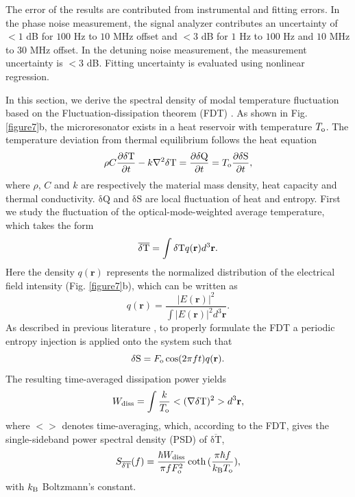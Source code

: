 \documentclass[noshowpacs,amsmath,
twocolumn,
superscriptaddress,
8pt,
aps,prb]{revtex4-2}
\begin{document}
\begin{footnotesize}
The error of the results are contributed from instrumental and fitting errors. In the phase noise measurement, the signal analyzer contributes an uncertainty of $<1$ dB for $100$ Hz to $10$ MHz offset and $<3$ dB for $1$ Hz to $100$ Hz and $10$ MHz to $30$ MHz offset. In the detuning noise measurement, the measurement uncertainty is $<3$ dB. Fitting uncertainty is evaluated using nonlinear regression. 

\medskip


\noindent In this section, we derive the spectral density of modal temperature fluctuation based on the Fluctuation-dissipation theorem (FDT) \cite{callen1951irreversibility,landau1980statisticheskaia,levin2008fluctuation,kondratiev2018thermorefractive}. As shown in Fig. \ref{figure7}b, the microresonator exists in a heat reservoir with temperature $T_{\rm o}$. The temperature deviation from thermal equilibrium follows the heat equation
\begin{equation}
    \rho C \frac{\partial \mathrm{\delta T}}{\partial t}-k \nabla^2 \mathrm{\delta T}=\frac{\partial\mathrm{\delta Q}}{\partial t}=T_{\rm o} \frac{\partial \mathrm{\delta S}}{\partial t},
    \label{Eq:heateq}
\end{equation}
where $\rho$, $C$ and $k$ are respectively the material mass density, heat capacity and thermal conductivity. $\mathrm{\delta Q}$ and $\mathrm{\delta S}$ are local fluctuation of heat and entropy. First we study the fluctuation of the optical-mode-weighted average temperature, which takes the form
\begin{equation}
    \overline{\mathrm{\delta T}}=\int \mathrm{\delta T} q({\bf r}) d^3{\bf r}.
\end{equation}
Here the density $q(\mathbf{r})$ represents the normalized distribution of the electrical field intensity (Fig. \ref{figure7}b), which can be written as
\begin{equation}
    q(\mathbf{r})=\frac{|E(\mathbf{r})|^{2}}{\int|E(\mathbf{r})|^{2}d^{3}\mathbf{r}}.
\end{equation}
As described in previous literature \cite{levin2008fluctuation,kondratiev2018thermorefractive}, to properly formulate the FDT a periodic entropy injection is applied onto the system such that
\begin{equation}
    \mathrm{\delta S}=F_{\rm o} \cos (2\pi ft) q({\bf r}).
\end{equation}
The resulting time-averaged dissipation power yields
\begin{equation}
    W_{\rm diss}
    =\int \frac{k}{T_{\rm o}}<(\nabla \mathrm{\delta T})^2> d^3\mathbf{r},
\end{equation}
where $<>$ denotes time-averaging, which, according to the FDT, gives the single-sideband power spectral density (PSD) of $\overline{\mathrm{\delta T}}$,
\begin{equation}
    S_{\overline{\mathrm{\delta T}}}(f)
    =\frac{\hbar W_{\rm diss}}{\pi f F_{\rm o}^2}\coth{(\frac{\pi\hbar f}{k_{\rm B}T_{\rm o}})},
    \label{DFT}
\end{equation}
with $k_{\rm B}$ Boltzmann's constant.


\end{footnotesize}
\end{document}
